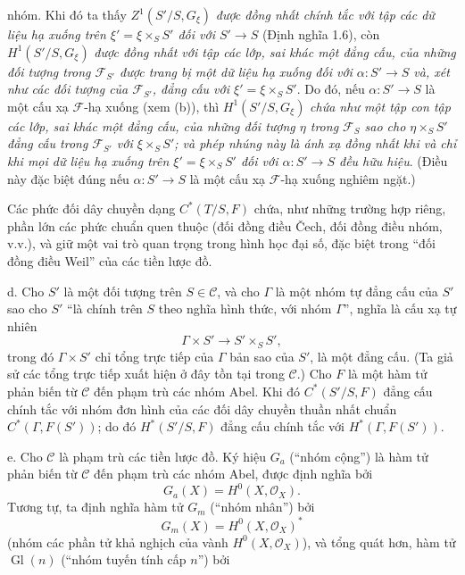 nhóm. Khi đó ta thấy $Z^1(S'/S,G_\xi)$ \emph{được đồng nhất chính tắc với tập
các dữ liệu hạ xuống trên $\xi'=\xi\times_SS'$ đối với
$S'\longrightarrow S$} (Định nghĩa 1.6), còn $H^1(S'/S,G_\xi)$ \emph{được
đồng nhất với tập các lớp, sai khác một đẳng cấu, của những đối tượng trong
$\mathcal F_{S'}$ được trang bị một dữ liệu hạ xuống đối với
$\alpha:S'\longrightarrow S$ và, xét như các đối tượng của
$\mathcal F_{S'}$, đẳng cấu với $\xi'=\xi\times_SS'$}. Do đó, nếu
$\alpha:S'\longrightarrow S$ là một cấu xạ $\mathcal F$-hạ xuống (xem (b)),
thì $H^1(S'/S,G_\xi)$ \emph{chứa như một tập con tập các lớp, sai khác một
đẳng cấu, của những đối tượng $\eta$ trong $\mathcal F_S$ sao cho
$\eta\times_SS'$ đẳng cấu trong $\mathcal F_{S'}$ với $\xi\times_SS'$; và phép
nhúng này là ánh xạ đồng nhất khi và chỉ khi mọi dữ liệu hạ xuống trên
$\xi'=\xi\times_SS'$ đối với $\alpha:S'\longrightarrow S$ đều hữu hiệu}.
(Điều này đặc biệt đúng nếu $\alpha:S'\longrightarrow S$ là một cấu xạ
$\mathcal F$-hạ xuống nghiêm ngặt.)

 Các phức đối dây chuyền dạng $C^*(T/S,F)$ chứa, như những
trường hợp riêng, phần lớn các phức chuẩn quen thuộc (đối đồng điều Čech, đối
đồng điều nhóm, v.v.), và giữ một vai trò quan trọng trong hình học đại số,
đặc biệt trong “đối đồng điều Weil” của các tiền lược đồ.

\medskip\noindent
d.  Cho $S'$ là một đối tượng trên $S\in\mathcal C$, và cho
$\Gamma$ là một nhóm tự đẳng cấu của $S'$ sao cho $S'$ “là chính trên $S$
theo nghĩa hình thức, với nhóm $\Gamma$”, nghĩa là cấu xạ tự nhiên
\[
  \Gamma\times S'\longrightarrow S'\times_SS',
\]
trong đó $\Gamma\times S'$ chỉ tổng trực tiếp của $\Gamma$ bản sao của $S'$,
là một đẳng cấu. (Ta giả sử các tổng trực tiếp xuất hiện
ở đây tồn tại trong $\mathcal C$.) Cho $F$ là một hàm tử phản biến từ
$\mathcal C$ đến phạm trù các nhóm Abel. Khi đó $C^*(S'/S,F)$ đẳng cấu chính
tắc với nhóm đơn hình của các đối dây chuyền thuần nhất chuẩn
$C^*(\Gamma,F(S'))$; do đó $H^*(S'/S,F)$ đẳng cấu chính tắc với
$H^*(\Gamma,F(S'))$.

\medskip\noindent
e.  Cho $\mathcal C$ là phạm trù các tiền lược đồ. Ký hiệu
$G_a$ (“nhóm cộng”) là hàm tử phản biến từ $\mathcal C$ đến phạm trù các
nhóm Abel, được định nghĩa bởi
\[
  G_a(X)=H^0(X,\mathcal O_X).
\]
Tương tự, ta định nghĩa hàm tử $G_m$ (“nhóm nhân”) bởi
\[
  G_m(X)=H^0(X,\mathcal O_X)^*
\]
(nhóm các phần tử khả nghịch của vành $H^0(X,\mathcal O_X)$), và tổng quát hơn,
hàm tử $\operatorname{Gl}(n)$ (“nhóm tuyến tính cấp $n$”) bởi

